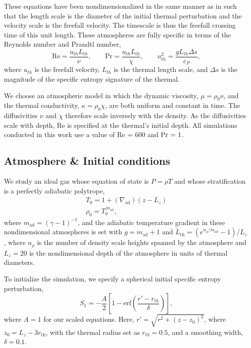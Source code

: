 \documentclass[twocolumn, amsmath, amsfonts, amssymb, trackchanges]{aastex62}
\newcommand{\grad}{\ensuremath{\nabla}}
\begin{document}
These equations have been nondimensionalized in the same manner as in \citet{lecoanet&jeevanjee2018} such that the length scale is the diameter of the initial thermal perturbation and the velocity scale is the freefall velocity. 
The timescale is thus the freefall crossing time of this unit length. 
These atmospheres are fully specific in terms of the Reynolds number and Prandtl number,
\begin{equation}
\text{Re} = \frac{u_{th} L_{th}}{\nu}, \qquad
\text{Pr} = \frac{u_{th} L_{th}}{\chi}, \qquad
u_{th}^2 = \frac{g L_{th} \Delta s}{c_P},
\end{equation}
where $u_{th}$ is the freefall velocity, $L_{th}$ is the thermal length scale, and
$\Delta s$ is the magnitude of the specific entropy signature of the thermal.

We choose an atmospheric model in which the dynamic viscosity, $\mu = \rho_0 \nu$, and the thermal conductivity, $\kappa = \rho_0 \chi$, are both uniform and constant in time.
The diffusivities $\nu$ and $\chi$ therefore scale inversely with the density.
As the diffusivities scale with depth, Re is specified at the thermal's initial depth.
All simulations conducted in this work use a value of Re = 600 and $\mbox{\text{Pr} = 1}$.

\subsection{Atmosphere \& Initial conditions}
We study an ideal gas whose equation of state is $P = \rho T$ and whose stratification is a perfectly adiabatic polytrope,
\begin{gather}
T_0 = 1 + (\grad_{\text{ad}})(z - L_z) \\
\rho_0 = T_0^{\,m_{\text{ad}}},
\label{eqn:polytrope}
\end{gather}
where $m_{\text{ad}} = (\gamma-1)^{-1}$, and the adiabatic temperature gradient in these nondimensional atmospheres is set with $g = m_{\text{ad}} + 1$ and $\tilde{L}_{\text{th}} = (e^{n_\rho/m_{\text{ad}}} - 1)/L_z$, where $n_\rho$ is the number of density scale heights spanned by the atmosphere and $L_z = 20$ is the nondimensional depth of the atmosphere in units of thermal diameters.
 
To initialize the simulation, we specify a spherical initial specific entropy perturbation,
\begin{equation}
S_1 = - \frac{A}{2}\left[1 - \text{erf}\left(\frac{r' - r_{th}}{\delta}\right)\right],
\label{eqn:thermal_IC}
\end{equation}
where $A = 1$ for our scaled equations.
Here, $r' = \sqrt{r^2 + (z - z_0)^2}$, where $z_0 = L_z - 3r_{\text{th}}$, with the thermal radius set as $r_{th} = 0.5$, and a smoothing width, $\delta = 0.1$.
\end{document}
